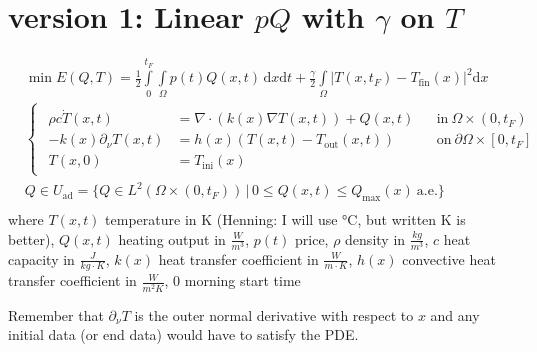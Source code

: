 \documentclass[landscape,parskip=half,7pt]{scrartcl}
\begin{document}
	\section{version 1: Linear $pQ$ with $\gamma$ on $T$}
	\begin{align*}
		&\min E(Q,T)=\frac12\int\limits_{0}^{t_F}\int\limits_\Omega p(t)Q(x,t)\,\mathrm{d}x\mathrm dt+\frac\gamma2\int\limits_\Omega |T(x,t_F)-T_\text{fin}(x)|^2\mathrm dx \\
		&\begin{cases}\begin{aligned}
			\rho c\dot T(x,t)&=\nabla\cdot\left(k(x)\nabla T(x,t)\right)+Q(x,t) && \text{in}\ \Omega\times(0,t_F) \\
			-k(x)\partial_\nu T(x,t)&=h(x)\left(T(x,t)-T_\text{out}(x,t)\right) && \text{on}\ \partial\Omega\times[0,t_F]\\
			T(x,0)&=T_\text{ini}(x) &&
		\end{aligned}\end{cases}\tag{SE}\\
		& Q\in U_\text{ad}=\{Q\in L^2(\Omega\times(0,t_F))\,|\,0\leq Q(x,t)\leq Q_\text{max}(x)\ \text{a.e.}\}\\
	\end{align*}
	where
	$T(x,t)$ temperature in K (Henning: I will use °C, but written K is better), $Q(x,t)$ heating output in $\frac W {m^3}$, $p(t)$ price, $\rho$ density in $\frac{kg}{m^3}$, $c$ heat capacity in $\frac{J}{kg\cdot K}$, $k(x)$ heat transfer coefficient in $\frac W{m\cdot K}$, $h(x)$ convective heat transfer coefficient in $\frac W{m^2K}$, $0$ morning start time

	Remember that $\partial_\nu T$ is the outer normal derivative with respect to $x$ and any initial data (or end data) would have to satisfy the PDE.
\end{document}
